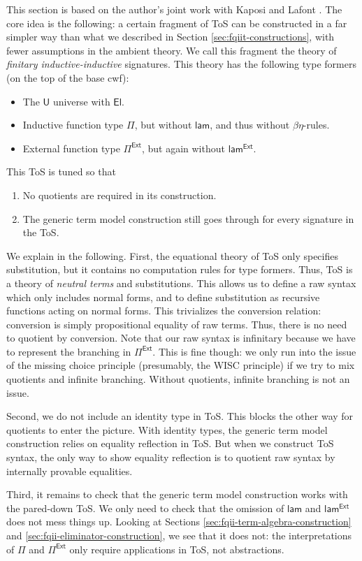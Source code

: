 \documentclass[12pt,a4paper,twoside,openany]{book}
\theoremstyle{remark}
\theoremstyle{definition}
\theoremstyle{theorem}
\newcommand{\ms}[1]{\mathsf{#1}}
\newcommand{\U}{\mathsf{U}}
\newcommand{\El}{\mathsf{El}}
\newcommand{\lami}{\mathsf{lam}}
\newcommand{\Pie}{\Pi^{\mathsf{Ext}}}
\newcommand{\lame}{\mathsf{lam^{Ext}}}
\newcommand{\lam}{\ms{lam}}
\begin{document}
This section is based on the author's joint work with Kaposi and Lafont
\cite{ind-ind-reduction}. The core idea is the following: a certain fragment of
ToS can be constructed in a far simpler way than what we described in Section
\ref{sec:fqiit-constructions}, with fewer assumptions in the ambient theory.  We
call this fragment the theory of \emph{finitary inductive-inductive} signatures.
This theory has the following type formers (on the top of the base cwf):
\begin{itemize}
  \item The $\U$ universe with $\El$.
  \item Inductive function type $\Pi$, but without $\lami$, and thus without $\beta\eta$-rules.
  \item External function type $\Pie$, but again without $\lame$.
\end{itemize}
This ToS is tuned so that
\begin{enumerate}
  \item No quotients are required in its construction.
  \item The generic term model construction still goes through for every signature in
        the ToS.
\end{enumerate}
We explain in the following. First, the equational theory of ToS only specifies
substitution, but it contains no computation rules for type formers. Thus, ToS
is a theory of \emph{neutral terms} and substitutions. This allows us to define
a raw syntax which only includes normal forms, and to define substitution as
recursive functions acting on normal forms. This trivializes the conversion
relation: conversion is simply propositional equality of raw terms. Thus, there
is no need to quotient by conversion. Note that our raw syntax is infinitary
because we have to represent the branching in $\Pie$. This is fine though: we
only run into the issue of the missing choice principle (presumably, the
WISC principle) if we try to mix quotients and infinite branching. Without
quotients, infinite branching is not an issue.

Second, we do not include an identity type in ToS. This blocks the other way for
quotients to enter the picture. With identity types, the generic term model
construction relies on equality reflection in ToS. But when we construct ToS
syntax, the only way to show equality reflection is to quotient raw syntax by
internally provable equalities.

Third, it remains to check that the generic term model construction works with
the pared-down ToS. We only need to check that the omission of $\lam$ and
$\lame$ does not mess things up. Looking at Sections
\ref{sec:fqii-term-algebra-construction} and
\ref{sec:fqii-eliminator-construction}, we see that it does not: the
interpretations of $\Pi$ and $\Pie$ only require applications in ToS, not
abstractions.
\end{document}
